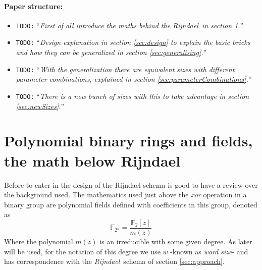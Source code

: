 \documentclass[10pt,a4paper,twoside]{llncs}
\newcommand{\todo}[1]{\texttt{\color{red}TODO:} ``\emph{#1}''}
\newcommand{\rijndael}{\emph{Rijndael}}
\newcommand{\Fpn}[2]{\ensuremath{\mathbb{F}_{#1^#2}}}
\begin{document}
\paragraph{Paper structure:}
\begin{itemize}
 \item \todo{First of all introduce the maths behind the \rijndael\, in section \ref{sec:math}.}
 \item \todo{Design explanation in section \ref{sec:design} to explain the basic bricks and how they can be generalized in section \ref{sec:generalising}.}
 \item \todo{With the generalization there are equivalent sizes with different parameter combinations, explained in section \ref{sec:parameterCombinations}.}
 \item \todo{There is a new bunch of sizes with this to take advantage in section \ref{sec:newSizes}.}
\end{itemize}

\section{Polynomial binary rings and fields, the math below Rijndael}\label{sec:math}
Before to enter in the design of the Rijndael schema is good to have a review over the background used. The mathematics used just above the \emph{xor} operation in a binary group are polynomial fields defined with coefficients in this group, denoted as
\begin{equation}\label{eq:polynomialField} 
    \Fpn{2}{n}=\frac{\mathbb{F}_{2}[z]}{m(z)}
\end{equation}
Where the polynomial $m(z)$ is an irreducible with some given degree. As later will be used, for the notation of this degree we use $w$ -known as \emph{word size}- and has correspondence with the \rijndael\, schema of section \ref{sec:approach}.
\end{document}
